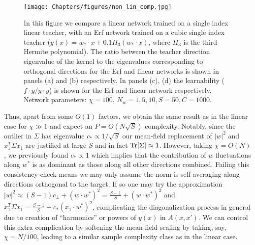 \begin{figure*}[t]
\vskip -0.8in
\begin{centering}
\texttt{[image: Chapters/figures/non\_lin\_comp.jpg]}
\caption{In this figure we compare a linear network trained on a single index linear teacher, with an Erf network trained on a cubic single index teacher ($y(x)=w_* \cdot x +0.1 H_3(w_*\cdot x)$, where $H_3$ is the third Hermite polynomial). The ratio between the teacher direction eigenvalue of the kernel to the eigenvalues corresponding to orthogonal directions for the Erf and linear networks is shown in panels (a) and (b) respectively. In panels (c), (d) the learnability ($f\cdot y/y\cdot y$) is shown for the Erf and linear network respectively.  Network parameters:
$\chi=100$, $N_w=1,5,10,S=50,C=1000$.}
\label{fig:amp_fact_cnn}
\par\end{centering}
\vskip -0.2in
\end{figure*}

Thus, apart from some $O(1)$ factors, we obtain the same result as in the linear case for $\chi \gg 1$ and expect an $P=O(N\sqrt{S})$ complexity. Notably, since the outlier in $\Sigma$ has eigenvalue $c_* \propto 1/\sqrt{S}$ our mean-field replacement of $|w|^2$ and $x_1^T \Sigma x_1$ are justified at large $S$ and in fact $\text{Tr}[\Sigma]\approx 1$. However, taking $\chi = O(N)$, we previously found $c_* \propto 1$ which implies that the contribution of $w$ fluctuations along $w^*$ is as dominant as those along all other directions combined. Failing this consistency check means we may only assume the norm is self-averaging along directions orthogonal to the target. If so one may try the approximation $|w|^2 \approx (S-1) c_{\perp}+(w \cdot {w}^*)^2=\frac{S-1}{S}+(w \cdot {w}^*)^2$ and $x_1^T \Sigma x_1 = \frac{S-1}{S}+c_* (x_1 \cdot {w}^*)^2$, complicating the diagonalization process in general due to creation of ``harmonics'' or powers of $y(x)$ in $A(x,x')$. We can control this extra complication by softening the mean-field scaling by taking, say, $\chi = N/100$, leading to a similar sample complexity class as in the linear case. 


